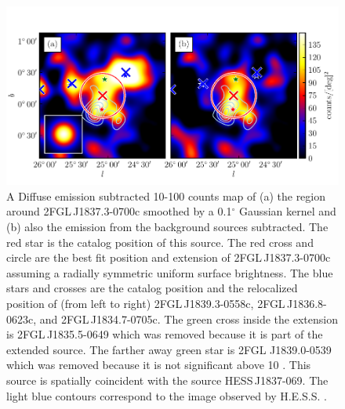 \documentclass[12pt,preprint]{aastex}
\newcommand{\gev}{\text{GeV}\xspace}
\newcommand{\tev}{\text{TeV}\xspace}
\renewcommand{\deg}{\ensuremath{^\circ}\xspace}
\begin{document}
\begin{figure}
  \begin{center}
    \includegraphics[type=pdf,ext=.pdf,read=.pdf]{source_plots/source_1FGL_J1837.5-0659c}
  \end{center}
  \caption{
  A Diffuse emission subtracted 10-100 \gev counts map of
  (a)
  the region around 2FGL\,J1837.3-0700c smoothed by a 0.1\deg Gaussian
  kernel and (b) also the emission from the background 
  sources subtracted.  The red
  star is the catalog position of this source. The red cross and circle
  are the best fit position and extension  of 2FGL\,J1837.3-0700c 
  assuming a radially
  symmetric uniform surface brightness. The blue stars and crosses are the
  catalog position and the relocalized position of (from left to right)
  2FGL\,J1839.3-0558c, 2FGL\,J1836.8-0623c, and 2FGL\,J1834.7-0705c.
  The green cross inside the extension is 2FGL\,J1835.5-0649 which
  was removed because it is part of the extended source.  The farther
  away green star is 2FGL J1839.0-0539 which was removed because
  it is not significant above 10 \gev.  This source is spatially
  coincident with the \tev source HESS\,J1837-069.  The light blue
  contours correspond to the \tev image observed by H.E.S.S.
  \citep{hess_plane_survey}.}\label{1FGL_J1837.5-0659c}
\end{figure}
\end{document}
